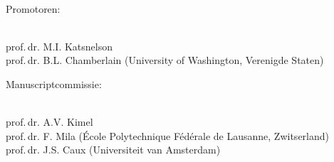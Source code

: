 \begin{titlingpage}
\hfill\\[0.4cm]
\parbox{4.0cm}{Promotoren:}\hfill\\[0.3cm]
\indent\hspace{0.5cm}prof.\,dr. M.I. Katsnelson\\[0.1cm]
\indent\hspace{0.5cm}prof.\,dr. B.L. Chamberlain (University of Washington, Verenigde Staten)\\[1cm]
\parbox{4.0cm}{Manuscriptcommissie:}\hfill\\[0.3cm]
\indent\hspace{0.5cm}prof.\,dr. A.V. Kimel\\[0.1cm]%
\indent\hspace{0.5cm}prof.\,dr. F. Mila (École Polytechnique Fédérale de Lausanne, Zwitserland)\\[0.1cm]
\indent\hspace{0.5cm}prof.\,dr. J.S. Caux (Universiteit van Amsterdam)%
\end{titlingpage}
